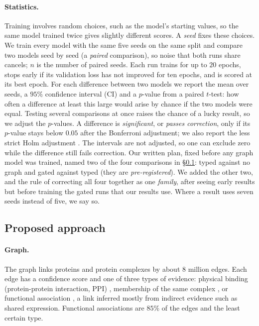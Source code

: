\documentclass{article}
\begin{document}
\paragraph{Statistics.} Training involves random choices, such as the model's starting values, so the
same model trained twice gives slightly different scores. A \emph{seed} fixes these choices. We train
every model with the same five seeds on the same split and compare two models seed by seed (a
\emph{paired} comparison), so noise that both runs share cancels; $n$ is the number of paired seeds. Each
run trains for up to $20$ epochs, stops early if its validation loss has not improved for ten epochs, and
is scored at its best epoch. For each difference
between two models we report the mean over seeds, a $95\%$ confidence interval (CI) and a $p$-value from a
paired $t$-test: how often a difference at least this large would arise by chance if the two models were
equal.
Testing several comparisons at once raises the chance of a lucky result, so we adjust the $p$-values. A difference is
\emph{significant}, or \emph{passes correction}, only if its $p$-value stays below $0.05$ after the
Bonferroni adjustment; we also report the less strict Holm adjustment \citep{holm1979}. The intervals are
not adjusted, so one can exclude zero while the difference still fails correction. Our written plan,
fixed before any graph model was trained, named two of the four comparisons in \S\ref{sec:approach}:
typed against no graph and gated against typed (they are \emph{pre-registered}). We added the other two,
and the rule of correcting all four together as one \emph{family}, after seeing early results but before
training the gated runs that our results use. Where a result uses seven seeds instead of five, we say so.

\subsection{Proposed approach}
\label{sec:approach}

\paragraph{Graph.} The graph links proteins and protein complexes by about $8$ million edges. Each edge
has a confidence score and one of three types of evidence: physical binding (protein-protein interaction,
PPI) \citep{huttlin2021bioplex,luck2020huri,oughtred2021biogrid}, membership of the same complex
\citep{tsitsiridis2023corum}, or functional association \citep{szklarczyk2023string}, a link inferred mostly
from indirect evidence such as shared expression. Functional associations are $85\%$ of the edges and the
least certain type.
\end{document}
